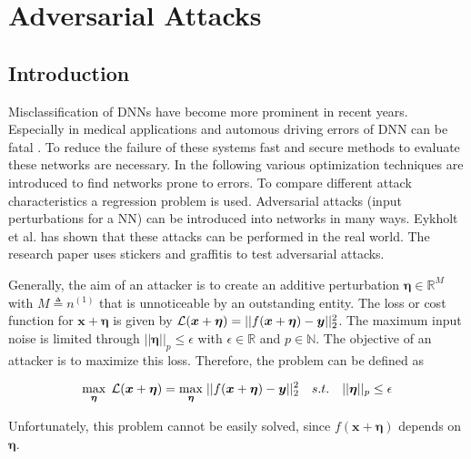 \chapter{Adversarial Attacks}\label{sec:chapter}

\section{Introduction}\label{sec:section}

\begingroup
Misclassification of DNNs have become more prominent in recent years. Especially in
medical applications and automous driving errors of DNN can be fatal \cite{NeuralMed,ControlPipeline}.
To reduce the failure of these systems fast and secure methods to evaluate these networks are necessary.
In the following various optimization techniques are introduced to find networks prone to errors.
To compare different attack characteristics a regression problem is used.
Adversarial attacks (input perturbations for a NN) can be introduced into networks in many ways.
Eykholt et al. \cite{RealWorld} has shown that these attacks can be performed in the real world. The research paper
uses stickers and graffitis to test adversarial attacks.

Generally, the aim of an attacker is to create an additive perturbation $ \bm{\eta} \in \mathbb{R}^M$ with $M \triangleq n^{(1)}$ that is unnoticeable by
an outstanding entity. The loss or cost function for $\bm{x} + \bm{\eta}$ is given by $ \mathcal{L}(\bm{x} + \bm{\eta}) = \lvert\lvert f(\bm{x} + \bm{\eta}) - \bm{y} \rvert\rvert^2_2 $.
The maximum input noise is limited through $\lvert\lvert \bm{\eta} \rvert\rvert_p \leq \epsilon$ with $\epsilon \in \mathbb{R}$ and $p \in \mathbb{N}$.
The objective of an attacker is to maximize this loss. Therefore, the problem can be defined as
\endgroup

\begin{equation}
\begin{aligned}
	\max_{ \bm{\eta} } \; \mathcal{L}(\bm{x} + \bm{\eta}) = \max_{ \bm{\eta} } \; \lvert\lvert f(\bm{x} + \bm{\eta}) - \bm{y} \rvert\rvert^2_2 \quad s.t. \quad \lvert\lvert \bm{\eta} \rvert\rvert_p  \leq \epsilon \\
\end{aligned}
\label{intromax}
\end{equation}


\begingroup
Unfortunately, this problem cannot be easily solved, since $f(\bm{x}+\bm{\eta})$ depends on $\bm{\eta}$.
\endgroup


